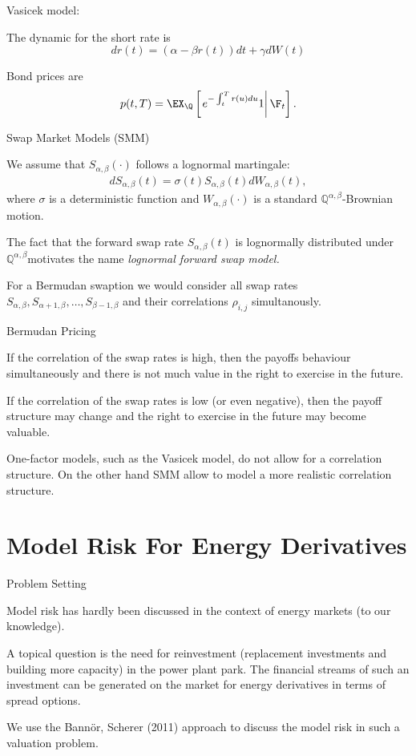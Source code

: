 {Vasicek model:}
\item<1-> The dynamic for the short rate is
$$
dr(t) = (\alpha -\beta r(t))dt +\gamma dW(t)
$$
\item<2-> Bond prices are
$$
p(t,T) = \EX_{\Q} \left[\left. e^{- \int_t^T r(u) du} 1
\right| \F_t \right].
$$

{Swap Market Models (SMM)}
\item<1->
We assume that $S_{\alpha,\beta}(\cdot)$ follows a
lognormal martingale:
\begin{eqnarray*}
dS_{\alpha,\beta}(t) = \sigma (t) S_{\alpha,\beta}(t)
dW_{\alpha,\beta}(t),
\end{eqnarray*}
where $\sigma$ is a deterministic function and
$W_{\alpha,\beta}(\cdot)$ is a standard $\mathbb
Q^{\alpha,\beta}$-Brownian motion.
\item<2-> The fact that the forward swap
rate $S_{\alpha,\beta}(t)$ is lognormally distributed under
$\mathbb Q^{\alpha,\beta}$motivates the name {\em lognormal
forward swap model.}
\item<3-> For a Bermudan swaption we would consider all swap rates
$S_{\alpha,\beta}, S_{\alpha+1,\beta}, \ldots, S_{\beta-1,\beta}$ and their correlations $\rho_{i,j}$ simultanously.

{Bermudan Pricing}
\item<1->
If the correlation of the swap rates is high, then the payoffs behaviour simultaneously and there is not much value in the right to exercise in the future.
\item<2-> If the correlation of the swap rates is low (or even negative), then the payoff structure may change  and the right to exercise in the future may become valuable.
\item<3-> One-factor models, such as the Vasicek model, do not allow for a correlation structure. On the other hand SMM allow to model a more realistic correlation structure. %

\section{Model Risk For Energy Derivatives}

{Problem Setting}
\item<1-> Model risk has hardly been discussed in the context of energy markets (to our knowledge).
\item<2-> A topical question is the need for reinvestment (replacement investments and building more capacity) in the power plant park. The financial streams of such an investment can be generated on the market for energy derivatives in terms of spread options.
\item<3-> We use the Bann{\"o}r, Scherer (2011) approach to discuss the model risk in such a valuation problem.

